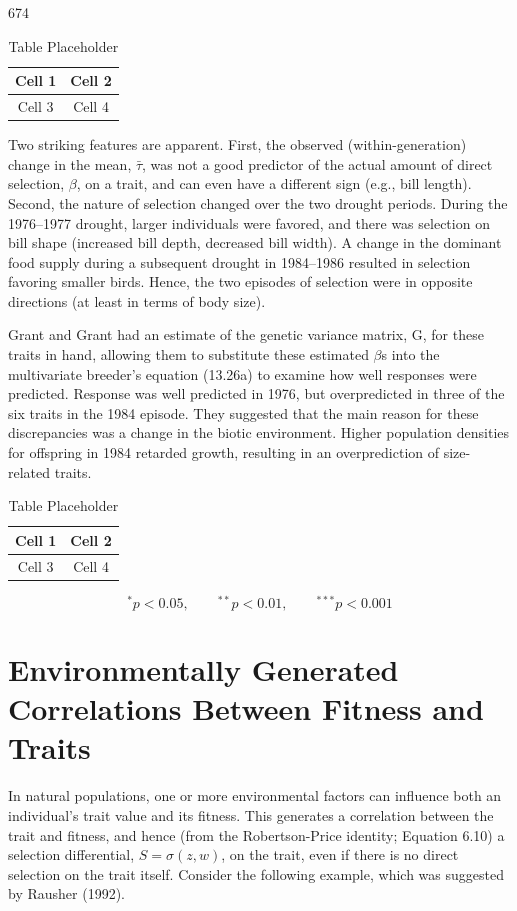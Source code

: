 \documentclass{article}
\begin{document}
674

\begin{table}[h]
\centering
\begin{tabular}{|c|c|}
\hline
Cell 1 & Cell 2 \\
\hline
Cell 3 & Cell 4 \\
\hline
\end{tabular}
\caption{Table Placeholder}
\end{table}

Two striking features are apparent. First, the observed (within-generation) change in the mean,  $ \bar{\tau} $, was not a good predictor of the actual amount of direct selection,  $ \beta $, on a trait, and can even have a different sign (e.g., bill length). Second, the nature of selection changed over the two drought periods. During the 1976–1977 drought, larger individuals were favored, and there was selection on bill shape (increased bill depth, decreased bill width). A change in the dominant food supply during a subsequent drought in 1984–1986 resulted in selection favoring smaller birds. Hence, the two episodes of selection were in opposite directions (at least in terms of body size).

Grant and Grant had an estimate of the genetic variance matrix, G, for these traits in hand, allowing them to substitute these estimated  $ \beta $s into the multivariate breeder's equation (13.26a) to examine how well responses were predicted. Response was well predicted in 1976, but overpredicted in three of the six traits in the 1984 episode. They suggested that the main reason for these discrepancies was a change in the biotic environment. Higher population densities for offspring in 1984 retarded growth, resulting in an overprediction of size-related traits.

\begin{table}[h]
\centering
\begin{tabular}{|c|c|}
\hline
Cell 1 & Cell 2 \\
\hline
Cell 3 & Cell 4 \\
\hline
\end{tabular}
\caption{Table Placeholder}
\end{table}

\begin{equation}
^{*}p<0.05,\qquad^{**}p<0.01,\qquad^{***}p<0.001
\end{equation}

\section{Environmentally Generated Correlations Between Fitness and Traits}
In natural populations, one or more environmental factors can influence both an individual's trait value and its fitness. This generates a correlation between the trait and fitness, and hence (from the Robertson-Price identity; Equation 6.10) a selection differential,  $ S = \sigma(z, w) $, on the trait, even if there is no direct selection on the trait itself. Consider the following example, which was suggested by Rausher (1992).
\end{document}

